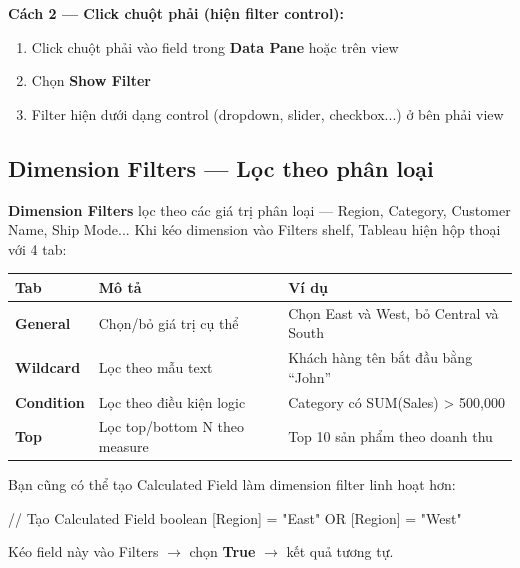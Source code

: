 \documentclass[12pt]{article}
\begin{document}
\noindent \textbf{Cách 2 --- Click chuột phải (hiện filter control):}

\begin{enumerate}[nosep]
    \item Click chuột phải vào field trong \textbf{Data Pane} hoặc trên view
    \item Chọn \textbf{Show Filter}
    \item Filter hiện dưới dạng control (dropdown, slider, checkbox...) ở bên phải view
\end{enumerate}

\subsection{Dimension Filters --- Lọc theo phân loại}

\noindent \textbf{Dimension Filters} lọc theo các giá trị phân loại --- Region, Category, Customer Name, Ship Mode... Khi kéo dimension vào Filters shelf, Tableau hiện hộp thoại với 4 tab:

\begin{center}
\renewcommand{\arraystretch}{1.4}
\begin{tabularx}{\linewidth}{l X X}
\toprule
\textbf{Tab} & \textbf{Mô tả} & \textbf{Ví dụ} \\
\midrule
\textbf{General} & Chọn/bỏ giá trị cụ thể & Chọn East và West, bỏ Central và South \\
\textbf{Wildcard} & Lọc theo mẫu text & Khách hàng tên bắt đầu bằng ``John'' \\
\textbf{Condition} & Lọc theo điều kiện logic & Category có SUM(Sales) > 500,000 \\
\textbf{Top} & Lọc top/bottom N theo measure & Top 10 sản phẩm theo doanh thu \\
\bottomrule
\end{tabularx}
\end{center}

\noindent Bạn cũng có thể tạo Calculated Field làm dimension filter linh hoạt hơn:

\begin{aivncodebox}[]
\begin{python}
// Tạo Calculated Field boolean
[Region] = "East" OR [Region] = "West"
\end{python}
\end{aivncodebox}

\noindent Kéo field này vào Filters $\rightarrow$ chọn \textbf{True} $\rightarrow$ kết quả tương tự.
\end{document}
